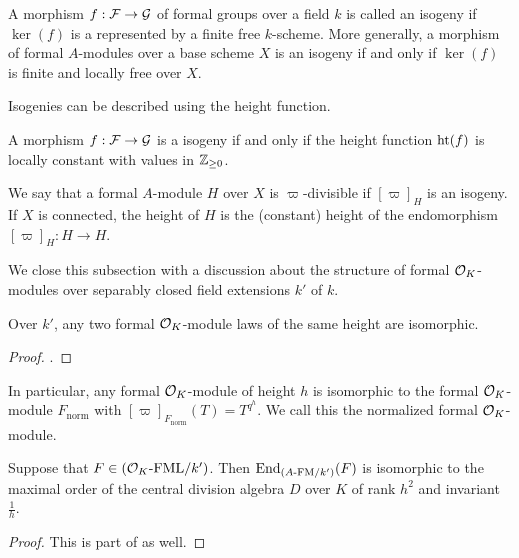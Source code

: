 \documentclass[../main.tex]{subfiles}
\begin{document}
\begin{defi}[Isogeny]
  A morphism $f: \mathcal{F} \to \mathcal{G}$ of formal groups over a field $k$ is called an isogeny if
  $\ker(f)$ is a represented by a finite free $k$-scheme. More generally, a
  morphism of formal $A$-modules over a base scheme $X$ is an isogeny if and
  only if $\ker(f)$ is finite and locally free over $X$. 
\end{defi}

Isogenies can be described using the height function.

\begin{lem}
  A morphism $f: \mathcal{F} \to \mathcal{G}$ is a isogeny if and only if the height 
  function $\textnormal{ht}(f)$ is locally constant with values in $\mathbb{Z}_{\geq 0}$. 
\end{lem}

\begin{defi}
  We say that a formal $A$-module $H$ over $X$ is $\varpi$-divisible if 
  $[\varpi]_H$ is an isogeny. If $X$ is connected, the height of $H$ is the
  (constant) height of the endomorphism $[\varpi]_H: H \to H$. 
\end{defi}

We close this subsection with a discussion about the structure of 
formal $\mathcal{O}_K$-modules over separably closed field extensions $k'$ of
$k$. 
\begin{prop}\label{prop:classificationofmodulelawsbyheight}
  Over $k'$, any two formal $\mathcal{O}_K$-module laws of the same height are isomorphic.
\begin{proof}
  \cite[Proposition 1.7]{drinfel1974elliptic}.
\end{proof}
\end{prop}
In particular, any formal $\mathcal{O}_K$-module of height $h$ is isomorphic to 
the formal $\mathcal{O}_K$-module $F_\mathrm{norm}$ with $[\varpi]_{F_\mathrm{norm}}(T) =
  T^{q^h}$. We call this the normalized formal $\mathcal{O}_K$-module.

\begin{prop}\label{prop:EndomorphismsOfFormalModulesOverksep}
  Suppose that $F \in {({\mathcal{O}_K}\text-\allowbreak\mathrm{FML}/{k'})}$. Then $\operatorname{End}_{{({A}\text-\allowbreak\mathrm{FM}/{k'})}}(F)$ is 
  isomorphic to the maximal order
  of the central division algebra $D$ over $K$ of rank $h^2$ and invariant
  $\frac 1h$.
\begin{proof}
  This is part of \cite[Proposition 1.7]{drinfel1974elliptic}
  as well. 
\end{proof}
\end{prop}
\end{document}
